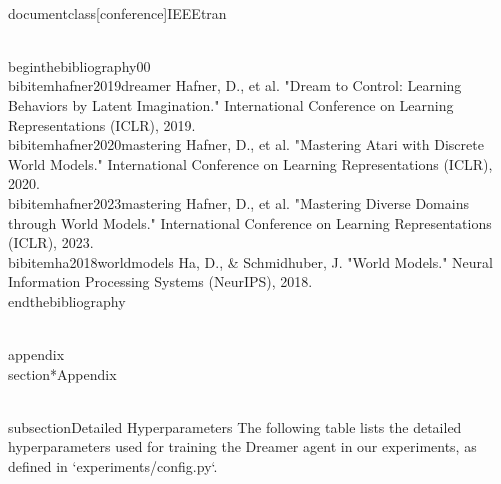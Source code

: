 \\documentclass[conference]{IEEEtran}
\begin{document}
\\begin{thebibliography}{00}
\\bibitem{hafner2019dreamer} Hafner, D., et al. "Dream to Control: Learning Behaviors by Latent Imagination." International Conference on Learning Representations (ICLR), 2019.
\\bibitem{hafner2020mastering} Hafner, D., et al. "Mastering Atari with Discrete World Models." International Conference on Learning Representations (ICLR), 2020.
\\bibitem{hafner2023mastering} Hafner, D., et al. "Mastering Diverse Domains through World Models." International Conference on Learning Representations (ICLR), 2023.
\\bibitem{ha2018worldmodels} Ha, D., \& Schmidhuber, J. "World Models." Neural Information Processing Systems (NeurIPS), 2018.
\\end{thebibliography}

\\appendix
\\section*{Appendix}

\\subsection{Detailed Hyperparameters}
The following table lists the detailed hyperparameters used for training the Dreamer agent in our experiments, as defined in `experiments/config.py`.
\end{document}
